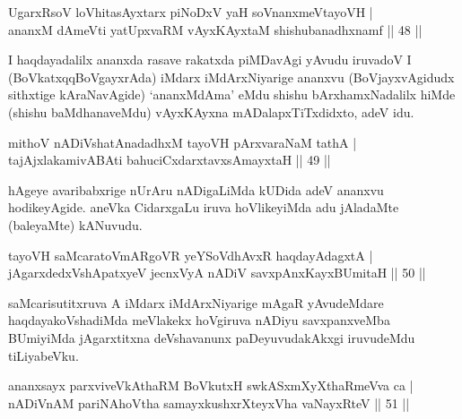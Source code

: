 
\begin{shl}
UgarxRsoV loVhitasAyxtarx piNoDxV yaH soV\s nanxmeVtayoVH |\\
ananxM dAmeVti yatUpxvaRM vAyxKAyxtaM shishubanadhxnamf \hfill || 48 || 
\end{shl}

\begin{artha}
I haqdayadalilx ananxda rasave rakatxda piMDavAgi yAvudu iruvadoV I (BoVkatxqqBoVgayxrAda) iMdarx iMdArxNiyarige ananxvu (BoVjayxvAgidudx sithxtige kAraNavAgide) `ananxMdAma' eMdu shishu bArxhamxNadalilx hiMde (shishu baMdhanaveMdu) vAyxKAyxna mADalapxTiTxdidxto, adeV idu.
\end{artha}


\begin{shl}
mithoV nADiVshatAnadadhxM tayoVH pArxvaraNaM tathA |\\
tajAjxlakamivA\s \s BAti bahuciCxdarxtavxsAmayxtaH \hfill || 49 || 
\end{shl}

\begin{artha}
hAgeye avaribabxrige nUrAru nADigaLiMda kUDida adeV ananxvu hodikeyAgide. aneVka CidarxgaLu iruva hoVlikeyiMda adu jAladaMte (baleyaMte) kANuvudu.
\end{artha}


\begin{shl}
tayoVH saMcaratoVmARgoVR yeYSoVdhAvxR haqdayAdagxtA |\\
jAgarxdedxVshApatxyeV jecnxVyA nADiV savxpAnxKayxBUmitaH \hfill || 50 || 
\end{shl}

\begin{artha}
saMcarisutitxruva A iMdarx iMdArxNiyarige mAgaR yAvudeMdare haqdayakoVshadiMda meVlakekx hoVgiruva nADiyu savxpanxveMba BUmiyiMda jAgarxtitxna deVshavanunx paDeyuvudakAkxgi iruvudeMdu tiLiyabeVku.
\end{artha}


\begin{shl}
ananxsayx parxviveVkAthaRM BoVkutxH swkASxmXyXthaRmeVva ca |\\
nADiVnAM pariNAhoV\s tha samayxkushxrXteyxVha vaNayxRteV \hfill || 51 || 
\end{shl}

